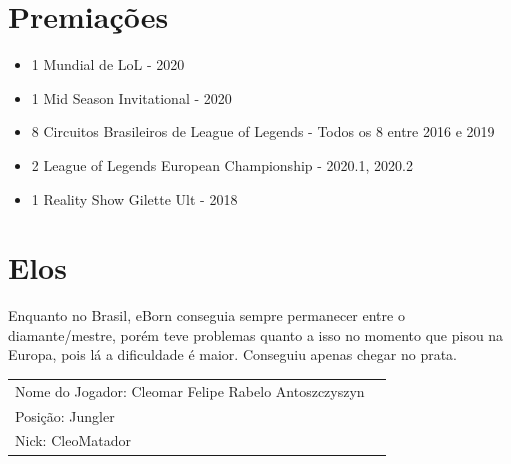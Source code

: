 \begin{multicols}{2}
	\section*{Premiações}
	\begin{itemize}
		\item 1 Mundial de LoL - 2020
		\item 1 Mid Season Invitational - 2020
		\item 8 Circuitos Brasileiros de League of Legends - Todos os 8 entre 2016 e 2019
		\item 2 League of Legends European Championship - 2020.1, 2020.2
		\item 1 Reality Show Gilette Ult - 2018
	\end{itemize}
	
	\section*{Elos}
	Enquanto no Brasil, eBorn conseguia sempre permanecer entre o  diamante/mestre, porém teve problemas quanto a isso no momento que pisou na Europa, pois lá a dificuldade é maior. Conseguiu apenas chegar no prata.
\end{multicols}    
\newpage

\begin{tabularx}{\linewidth}{@{}m{} m{}@{}}
	\large{Nome do Jogador: Cleomar Felipe Rabelo Antoszczyszyn} \\
	\large{Posição: Jungler}\\
	\large{Nick: CleoMatador}
\end{tabularx}

